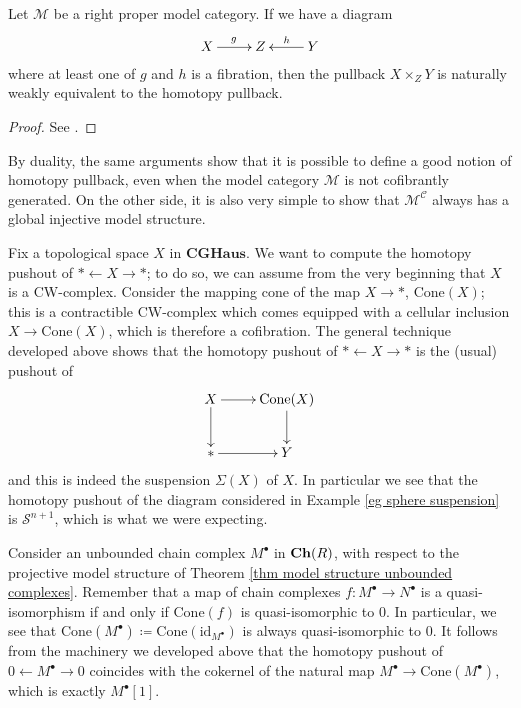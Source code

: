 \begin{refsection}
\begin{prop} \label{prop right proper}
Let $\mathcal M$ be a right proper model category. If we have a diagram
\[
\xymatrix{
X \ar[r]^g & Z & Y \ar[l]_h
}
\]
where at least one of $g$ and $h$ is a fibration, then the pullback $X \times_Z Y$ is naturally weakly equivalent to the homotopy pullback.
\end{prop}

\begin{proof}
See \cite[Corollary 13.3.8]{hirschhorn}.
\end{proof}

\begin{rmk}
By duality, the same arguments show that it is possible to define a good notion of homotopy pullback, even when the model category $\mathcal M$ is not cofibrantly generated. On the other side, it is also very simple to show that $\mathcal M^{\mathcal C}$ always has a global injective model structure.
\end{rmk}

\begin{eg} \label{eg topological suspension}
Fix a topological space $X$ in $\mathbf{CGHaus}$. We want to compute the homotopy pushout of $* \leftarrow X \rightarrow *$; to do so, we can assume from the very beginning that $X$ is a CW-complex. Consider the mapping cone of the map $X \to *$, $\mathrm{Cone}(X)$; this is a contractible CW-complex which comes equipped with a cellular inclusion $X \to \mathrm{Cone}(X)$, which is therefore a cofibration. The general technique developed above shows that the homotopy pushout of $* \leftarrow X \rightarrow *$ is the (usual) pushout of
\[
\xymatrix{
X \ar[d] \ar[r] & \mathrm{Cone}(X) \ar[d] \\ {*} \ar[r] & Y
}
\]
and this is indeed the suspension $\Sigma(X)$ of $X$. In particular we see that the homotopy pushout of the diagram considered in Example \ref{eg sphere suspension} is $\mathcal S^{n+1}$, which is what we were expecting.
\end{eg}

\begin{eg} \label{eg homological suspension}
Consider an unbounded chain complex $M^\bullet$ in $\mathbf{Ch}(R)$, with respect to the projective model structure of Theorem \ref{thm model structure unbounded complexes}. Remember that a map of chain complexes $f \colon M^\bullet \to N^\bullet$ is a quasi-isomorphism if and only if $\mathrm{Cone}(f)$ is quasi-isomorphic to $0$. In particular, we see that $\mathrm{Cone}(M^\bullet) \coloneqq \mathrm{Cone}(\mathrm{id}_{M^\bullet})$ is always quasi-isomorphic to $0$. It follows from the machinery we developed above that the homotopy pushout of $0 \leftarrow M^\bullet \rightarrow 0$ coincides with the cokernel of the natural map $M^\bullet \to \mathrm{Cone}(M^\bullet)$, which is exactly $M^\bullet[1]$.
\end{eg}


\end{refsection}
